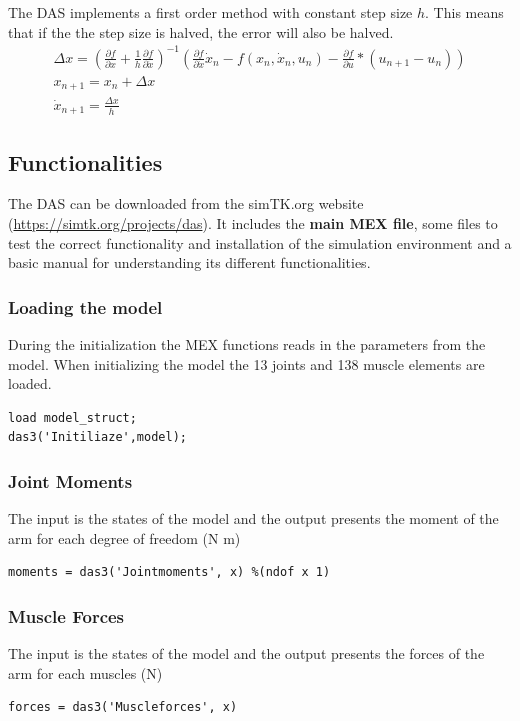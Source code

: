 The DAS implements a first order method with constant step size $h$. This means that if the the step size is halved, the error will also be halved. 
\begin{equation} \label{eq:rosenbrock}
 \begin{aligned}
    \Delta x = (\frac{\partial f}{\partial x} + \frac{1}{h}\frac{\partial f}
    {\partial \dot{x}})^{-1}(\frac{\partial f}{\partial \dot{x}}\dot{x}_n - f(x_n, \dot{x}_n, u_n) - \frac{\partial f}{\partial u}*(u_{n+1} - u_{n}))\\
    x_{n+1} = x_n + \Delta{x} \\
    \dot{x}_{n+1} = \frac{\Delta{x}}{h}
\end{aligned}
\end{equation} \newpage

\subsection{Functionalities}

The DAS can be downloaded from the simTK.org website (\href{https://simtk.org/projects/das}{https://simtk.org/projects/das}). It includes the \textbf{main MEX file}, some files to test the correct functionality and installation of the simulation environment and a basic manual for understanding its different functionalities. 

\subsubsection{Loading the model}

During the initialization the MEX functions reads in the parameters from the model. When initializing the model the 13 joints and 138 muscle elements are loaded.

\begin{lstlisting}[style=Matlab-editor]
load model_struct;
das3('Initiliaze',model);
\end{lstlisting}
\subsubsection{Joint Moments}
The input is the states of the model and the output presents the moment of the arm for each degree of freedom (N m)
\begin{lstlisting}[style=Matlab-editor]
moments = das3('Jointmoments', x) %(ndof x 1)
\end{lstlisting}

\subsubsection{Muscle Forces}
The input is the states of the model and the output presents the forces of the arm for each muscles (N)
\begin{lstlisting}[style=Matlab-editor]
forces = das3('Muscleforces', x)
\end{lstlisting}

